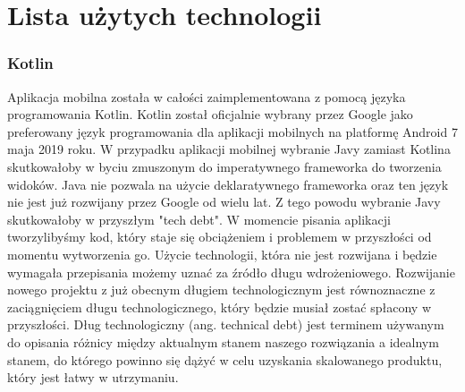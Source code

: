 \section{Lista użytych technologii}
\subsubsection{Kotlin}\label{app:used_technologies:kotlin}
Aplikacja mobilna została w całości zaimplementowana z pomocą języka programowania Kotlin.
Kotlin został oficjalnie wybrany przez Google jako preferowany język programowania dla aplikacji mobilnych na platformę Android 7 maja 2019 roku.
\cite{kotlinWikipedia}
W przypadku aplikacji mobilnej wybranie Javy zamiast Kotlina skutkowałoby w byciu zmuszonym do imperatywnego frameworka do tworzenia widoków.
Java nie pozwala na użycie deklaratywnego frameworka oraz ten język nie jest już rozwijany przez Google od wielu lat.
Z tego powodu wybranie Javy skutkowałoby w przyszłym "tech debt".
W momencie pisania aplikacji tworzylibyśmy kod, który staje się obciążeniem i problemem w przyszłości od momentu wytworzenia go.
Użycie technologii, która nie jest rozwijana i będzie wymagała przepisania możemy uznać za źródło długu wdrożeniowego.
\cite{legacyDebt}
Rozwijanie nowego projektu z już obecnym długiem technologicznym jest równoznaczne z zaciągnięciem długu technologicznego, który będzie musiał zostać spłacony w przyszłości.
Dług technologiczny (ang. technical debt) jest terminem używanym do opisania różnicy między aktualnym stanem naszego rozwiązania a idealnym stanem, do którego powinno się dążyć w celu uzyskania skalowanego produktu, który jest łatwy w utrzymaniu.
\cite{techDebtAccerelate}

